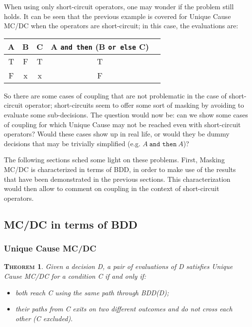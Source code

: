 \documentclass[a4paper,12pt,twoside]{article}
\newcommand{\andthen}{\texttt{and then}}
\newcommand{\orelse}{\texttt{or else}}
\newtheorem{theorem}{\textsc{Theorem}}
\begin{document}
When using only short-circuit operators, one may wonder if the problem
still holds. It can be seen that the previous example is covered for Unique
Cause MC/DC when the operators are short-circuit; in this case, the
evaluations are:

\begin{center}
\begin{tabular}{|c|c|c||c||c|}
\hline
A & B & C & A \andthen{} (B \orelse{} C) \\ \hline
T & F & T & T \\ \hline
F & x & x & F \\ \hline
\end{tabular}
\end{center}

So there are some cases of coupling that are not problematic in the case
of short-circuit operator; short-circuits seem to offer some sort of masking
by avoiding to evaluate some sub-decisions. The question would now be:
can we show some cases of coupling for which Unique Cause may not be reached
even with short-circuit operators? Would these cases show up in real life,
or would they be dummy decisions that may be trivially simplified (e.g.
$A \ \andthen{} \ A$)?

The following sections sched some light on these problems. First,
Masking MC/DC is characterized in terms of BDD, in order to make use
of the results that have been demonstrated in the previous sections.
This characterization would then allow to comment on coupling in the
context of short-circuit operators.

\subsection{MC/DC in terms of BDD}

\subsubsection{Unique Cause MC/DC}

\begin{theorem}
  \label{thm:unique-cause-bdd}
  Given a decision D, a pair of evaluations of D satisfies
  Unique Cause MC/DC for a condition C if and only if:
  \begin{itemize}
  \item both reach C using the same path through BDD(D);
  \item their paths from C exits on two different outcomes and do not cross
  each other (C excluded).
  \end{itemize}
\end{theorem}
\end{document}
